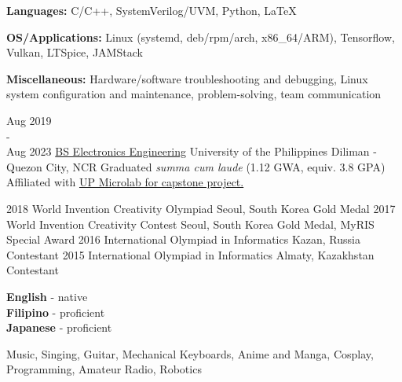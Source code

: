 \documentclass[9pt]{developercv}
\begin{document}
\hfill 
\begin{minipage}[t]{0.475\textwidth} 
	\vspace{-\baselineskip}


	\textbf{Languages:} C/C++, SystemVerilog/UVM, Python, LaTeX

	\textbf{OS/Applications:} Linux (systemd, deb/rpm/arch, x86\_64/ARM), Tensorflow, Vulkan, LTSpice, JAMStack

	\textbf{Miscellaneous:} Hardware/software troubleshooting and debugging, Linux system configuration and maintenance, problem-solving, team communication

	
	\begin{entrylist}
		\entry
			{Aug 2019 \\ - \\ Aug 2023}
			{\href{https://www.eee.upd.edu.ph/undergraduate-programs/bs-electronics-and-communications-engineering}{BS Electronics Engineering}}
			{University of the Philippines Diliman - Quezon City, NCR}
			{Graduated \emph{summa cum laude} (1.12 GWA, equiv. 3.8 GPA)\\
			Affiliated with \href{https://www.up-microlab.org/}{UP Microlab for capstone project.}}
	\end{entrylist}
	\cvsect{Achievements}
	\begin{entrylist}
		\entry
			{2018}
			{World Invention Creativity Olympiad}
			{Seoul, South Korea}
			{Gold Medal}
		\entry
			{2017}
			{World Invention Creativity Contest}
			{Seoul, South Korea}
			{Gold Medal, MyRIS Special Award}
		\entry
			{2016}
			{International Olympiad in Informatics}
			{Kazan, Russia}
			{Contestant}
		\entry
			{2015}
			{International Olympiad in Informatics}
			{Almaty, Kazakhstan}
			{Contestant}
	\end{entrylist}
\end{minipage}

\vspace{0.5cm}

\begin{minipage}[t]{0.2\textwidth}
	\vspace{-\baselineskip}

	\textbf{English} - native\\
	\textbf{Filipino} - proficient\\
	\textbf{Japanese} - proficient\\
\end{minipage}
\hfill
\begin{minipage}[t]{0.6\textwidth}
	\vspace{-\baselineskip}
	
	Music, Singing, Guitar, Mechanical Keyboards, Anime and Manga, Cosplay, Programming, Amateur Radio, Robotics
\end{minipage}
\end{document}
